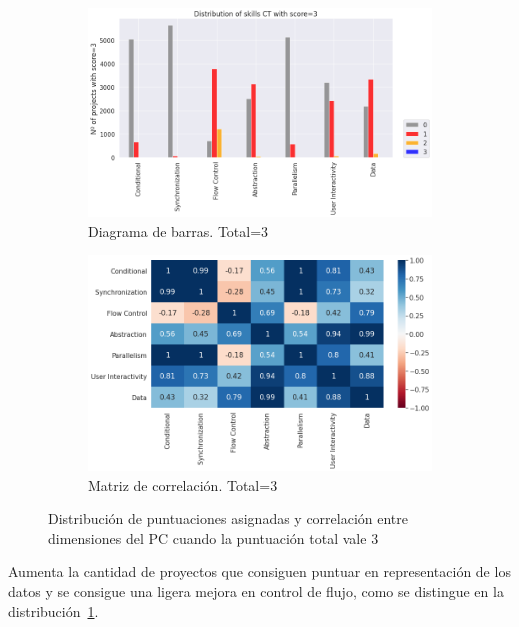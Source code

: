 \documentclass[a4paper, 12pt]{book}
\begin{document}
\begin{figure}[H]
    \centering
    \begin{subfigure}[h]{.49\textwidth} 
        \includegraphics[width=\textwidth]{img/distribucion_3_Snap}
        \caption{Diagrama de barras. Total=3}
        \label{fig:total3_Snap}
    \end{subfigure}       
    \begin{subfigure}[h]{.49\textwidth} 
        \includegraphics[width=\textwidth]{img/corr_3_Snap}
        \caption{Matriz de correlación. Total=3}
        \label{fig:corr3_Snap}
    \end{subfigure}
     \caption{Distribución de puntuaciones asignadas y correlación entre dimensiones del PC cuando la puntuación total vale 3}
\end{figure}

Aumenta la cantidad de proyectos que consiguen puntuar en representación de los datos y se consigue una ligera mejora en control de flujo, como se distingue en la distribución~\ref{fig:total3_Snap}.
\end{document}
